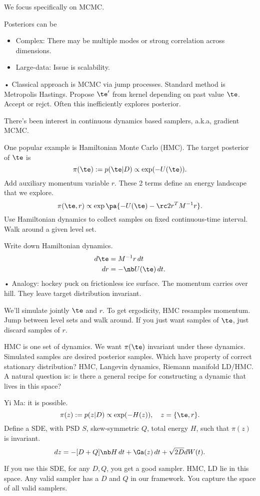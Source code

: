 We focus specifically on MCMC.

Posteriors can be 
\begin{itemize}
\item
Complex:
There may be multiple modes or strong correlation across dimensions. 
\item
Large-data: Issue is scalability.
\end{itemize}•
Classical approach is MCMC via jump processes. Standard method is Metropolis Hastings. Propose $\te'$ from kernel depending on past value $\te$. Accept or rejct. Often this inefficiently explores posterior.

There's been interest in continuous dynamics based samplers, a.k.a, gradient MCMC. 

One popular example is Hamiltonian Monte Carlo (HMC).  The target posterior of $\te$ is
$$
\pi(\te):= p(\te|D)\propto \exp(-U(\te)).
$$
Add auxiliary momentum variable $r$. These 2 terms define an energy landscape that we explore. 
$$
\pi(\te, r) \propto \exp\pa{-U(\te) - \rc 2 r^TM^{-1}r}.
$$
Use Hamiltonian dynamics to collect samples on fixed continuous-time interval.
Walk around a given level set.

Write down Hamiltonian dynamics.
\begin{align}
d\te &= M^{-1}r\,dt\\
dr &= -\nb U(\te)\,dt.
\end{align}•
Analogy: hockey puck on frictionless ice surface. The momentum carries over hill. They leave target distribution invariant.

We'll simulate jointly $\te$ and $r$. To get ergodicity, HMC resamples momentum. Jump between level sets and walk around. If you just want samples of $\te$, just discard samples of $r$.

HMC is one set of dynamics.
We want $\pi(\te)$ invariant under these dynamics. Simulated samples are desired posterior samples. 
Which have property of correct stationary distribution?
HMC, Langevin dynamics, Riemann manifold LD/HMC. A natural question is: is there a general recipe for constructing a dynamic that lives in this space? 

Yi Ma: it is possible. 
$$
\pi(z) := p(z|D) \propto \exp(-H(z)), \quad z=\{\te,r\}.
$$
Define a SDE, with PSD $S$, skew-symmetric $Q$, total energy $H$, such that $\pi(z)$ is invariant. 
$$dz=-[D+Q]\nb H \,dt + \Ga(z)\,dt + \sqrt{2D}dW(t).$$ %

If you use this SDE, for any $D,Q$, you get a good sampler. HMC, LD lie in this space. Any valid sampler has a $D$ and $Q$ in our framework.
You capture the space of all valid samplers.


